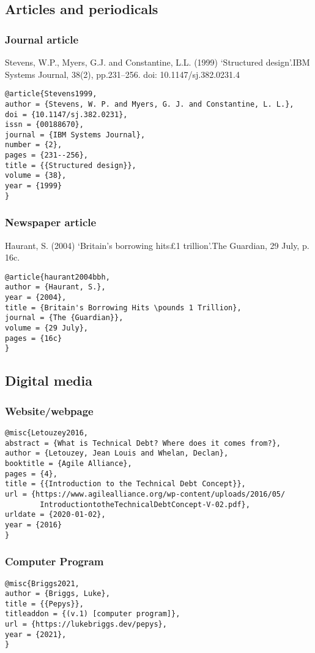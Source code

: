 \documentclass{article}
\begin{document}
\subsection{Articles and periodicals}
\subsubsection{Journal article}

Stevens,  W.P.,  Myers,  G.J.  and  Constantine,  L.L.  (1999)  ‘Structured  design’.IBM Systems Journal,  38(2),  pp.231–256.  doi:  10.1147/sj.382.0231.4

\begin{lstlisting}
@article{Stevens1999,
author = {Stevens, W. P. and Myers, G. J. and Constantine, L. L.},
doi = {10.1147/sj.382.0231},
issn = {00188670},
journal = {IBM Systems Journal},
number = {2},
pages = {231--256},
title = {{Structured design}},
volume = {38},
year = {1999}
}
\end{lstlisting}

\subsubsection{Newspaper article}

Haurant, S. (2004) ‘Britain’s borrowing hits£1 trillion’.The Guardian, 29 July, p. 16c.

\begin{lstlisting}
@article{haurant2004bbh,
author = {Haurant, S.},
year = {2004},
title = {Britain's Borrowing Hits \pounds 1 Trillion},
journal = {The {Guardian}},
volume = {29 July},
pages = {16c}
}
\end{lstlisting}

\subsection{Digital media}
\subsubsection{Website/webpage}


\begin{lstlisting}
@misc{Letouzey2016,
abstract = {What is Technical Debt? Where does it comes from?},
author = {Letouzey, Jean Louis and Whelan, Declan},
booktitle = {Agile Alliance},
pages = {4},
title = {{Introduction to the Technical Debt Concept}},
url = {https://www.agilealliance.org/wp-content/uploads/2016/05/
        IntroductiontotheTechnicalDebtConcept-V-02.pdf},
urldate = {2020-01-02},
year = {2016}
}
\end{lstlisting}

\subsubsection{Computer Program}


\begin{lstlisting}
@misc{Briggs2021,
author = {Briggs, Luke},
title = {{Pepys}},
titleaddon = {(v.1) [computer program]},
url = {https://lukebriggs.dev/pepys},
year = {2021},
}
\end{lstlisting}

\clearpage
\end{document}
